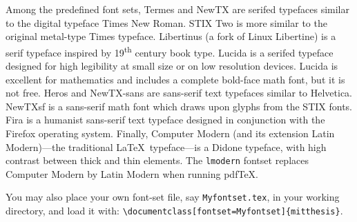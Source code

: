 \documentclass[11pt]{article}
\newcommand*\pdfTeX{pdf\TeX}
\begin{document}
Among the predefined font sets, Termes and NewTX are serifed typefaces similar to the digital typeface Times New Roman.  STIX Two is more similar to the original metal-type Times typeface. Libertinus (a fork of Linux Libertine) is a serif typeface inspired by 19\textsuperscript{th} century book type. Lucida is a serifed typeface designed for high legibility at small size or on low resolution devices. Lucida is excellent for mathematics and includes a complete bold-face math font, but it is not free. Heros and NewTX-sans are sans-serif text typefaces similar to Helvetica. NewTXsf is a sans-serif math font which draws upon glyphs from the STIX fonts. Fira is a humanist sans-serif text typeface designed in conjunction with the Firefox operating system. Finally, Computer Modern (and its extension Latin Modern)---the traditional \LaTeX\ typeface---is a Didone typeface, with high contrast between thick and thin elements.  The \texttt{lmodern} fontset replaces Computer Modern by Latin Modern when running \pdfTeX.

You may also place your own font-set file, say \texttt{Myfontset.tex}, in your working directory, and load it with:
\verb|\documentclass[fontset=Myfontset]{mitthesis}|.
\end{document}
